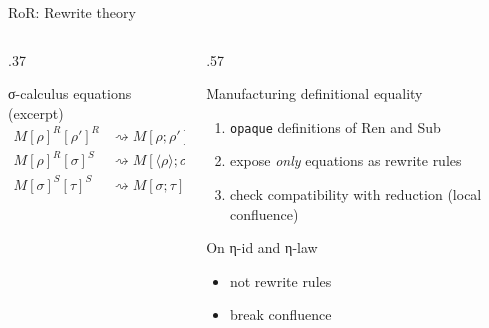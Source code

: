 \documentclass[pdftex,aspectratio=169]{beamer}
\begin{document}
\begin{frame}{RoR: Rewrite theory}
  \begin{columns}[T,onlytextwidth]
    \begin{column}{.37\textwidth}
      \begin{block}{σ-calculus equations (excerpt)}
        \small
        \begin{align*}
          M[\rho]^R[\rho']^R &\rightsquigarrow M[\rho\mathbin{;}\rho']^R\\
          M[\rho]^R[\sigma]^S &\rightsquigarrow M[\langle\rho\rangle\mathbin{;}\sigma]^S\\
          M[\sigma]^S[\tau]^S &\rightsquigarrow M[\sigma\mathbin{;}\tau]^S
        \end{align*}
      \end{block}
    \end{column}
    \begin{column}{.57\textwidth}
      \begin{block}{Manufacturing definitional equality}
        \small
        \begin{enumerate}
          \item \texttt{opaque} definitions of Ren and Sub
          \item expose \emph{only} equations as rewrite rules
          \item check compatibility with reduction (local confluence)
        \end{enumerate}
      \end{block}
      \begin{alertblock}{On η-id and η-law}
        \begin{itemize}
        \item not rewrite rules
        \item break confluence
        \end{itemize}
      \end{alertblock}
    \end{column}
  \end{columns}

\end{frame}
\end{document}
